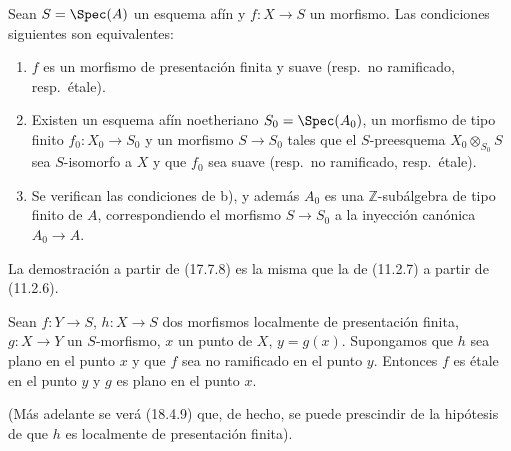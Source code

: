 \begin{corollary}[17.7.9]
\label{IV.17.7.9}
Sean $S=\Spec(A)$ un esquema afín y $f:X\to S$ un morfismo. Las condiciones siguientes son equivalentes:
\begin{enumerate}
  \item[\textup{a)}] $f$ es un morfismo de presentación finita y suave \textup{(resp.}\ no ramificado, \textup{resp.}\ étale\textup{)}.


  \item[\textup{b)}] Existen un esquema afín noetheriano $S_0=\Spec(A_0)$, un morfismo de tipo finito $f_0:X_0\to S_0$ y un morfismo $S\to S_0$ tales que el $S$-preesquema $X_0\otimes_{S_0}S$ sea $S$-isomorfo a $X$ y que $f_0$ sea suave \textup{(resp.}\ no ramificado, \textup{resp.}\ étale\textup{)}.
  \item[\textup{c)}] Se verifican las condiciones de \textup{b)}, y además $A_0$ es una $\mathbb{Z}$-subálgebra de tipo finito de $A$, correspondiendo el morfismo $S\to S_0$ a la inyección canónica $A_0\to A$.
\end{enumerate}
\end{corollary}

La demostración a partir de (17.7.8) es la misma que la de (11.2.7) a partir de (11.2.6).

\begin{proposition}[17.7.10]
\label{IV.17.7.10}
Sean $f:Y\to S$, $h:X\to S$ dos morfismos localmente de presentación finita, $g:X\to Y$ un $S$-morfismo, $x$ un punto de $X$, $y=g(x)$. Supongamos que $h$ sea \textup{plano} en el punto $x$ y que $f$ sea \textup{no ramificado} en el punto $y$. Entonces $f$ es \textup{étale} en el punto $y$ y $g$ es \textup{plano} en el punto $x$.
\end{proposition}

(Más adelante se verá (18.4.9) que, de hecho, se puede prescindir de la hipótesis de que $h$ es localmente de presentación finita).

